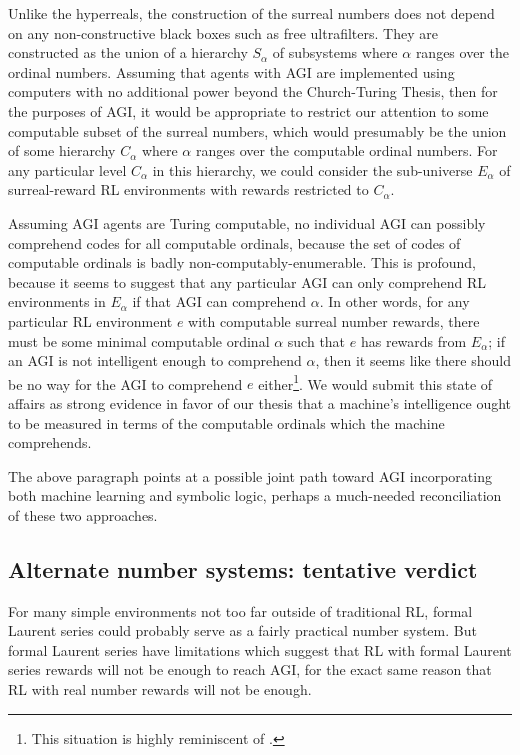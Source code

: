 \documentclass[twoside,11pt]{article}
\begin{document}
Unlike the hyperreals,
the construction of the surreal numbers does not depend on any
non-constructive black boxes such as free ultrafilters.
They are constructed as the union of a hierarchy $S_\alpha$ of subsystems where
$\alpha$ ranges over the ordinal numbers. Assuming that agents with AGI are
implemented using computers with no additional power beyond the Church-Turing
Thesis, then for the purposes of AGI, it would be appropriate to restrict our
attention to some computable subset of the surreal numbers, which would
presumably be the union of
some hierarchy $C_\alpha$ where $\alpha$ ranges over the computable ordinal numbers.
For any particular level $C_\alpha$ in this hierarchy, we could consider the
sub-universe $E_\alpha$ of surreal-reward RL environments with rewards restricted
to $C_\alpha$.

Assuming AGI agents are Turing computable,
no individual AGI can possibly comprehend codes for all computable ordinals, because
the set of codes of computable ordinals is badly non-computably-enumerable.
This is profound, because it seems to suggest that any particular AGI can
only comprehend RL environments in $E_\alpha$ if that AGI can comprehend $\alpha$.
In other words, for any particular RL environment $e$ with computable surreal number
rewards, there must be some minimal computable ordinal $\alpha$ such that $e$ has
rewards from $E_\alpha$; if an AGI is not intelligent enough to comprehend $\alpha$,
then it seems like there should be no way for the AGI to comprehend $e$
either\footnote{This situation is highly reminiscent of \citep{hibbard2011measuring}.}.
We would submit
this state of affairs as strong evidence in favor of our thesis
\citep{alexander2019measuring} that a machine's intelligence ought to be measured
in terms of the computable ordinals which the machine comprehends.

The above paragraph points at a possible joint path
toward AGI incorporating both machine learning and symbolic logic, perhaps
a much-needed reconciliation of these two approaches.

\subsection{Alternate number systems: tentative verdict}

For many simple environments not too far outside of traditional RL,
formal Laurent series could probably serve as a fairly practical number system.
But formal Laurent series have limitations which suggest that RL
with formal Laurent series rewards will not be enough to reach AGI, for the exact
same reason that RL with real number rewards will not be enough.
\end{document}
